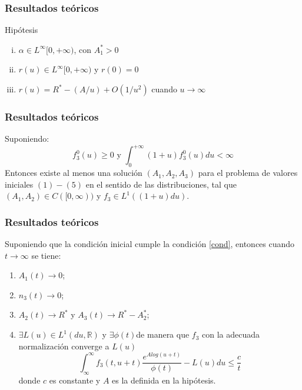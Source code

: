 \documentclass{beamer}
\begin{document}
\begin{frame}
	\frametitle{Resultados teóricos}
	\begin{block}{Hipótesis}
		
		\begin{enumerate}[(i)]
			\item $\alpha \in L^\infty[0,+\infty)$, con $A_1^*>0$
			\item $r(u)\in L^\infty[0,+\infty)$ y $r(0)=0$
			\item $r(u)=R^*-(A/u)+O(1/u^2)$ cuando $u\rightarrow\infty$
		\end{enumerate}
		
	\end{block}
	
\end{frame}


\begin{frame}
  \frametitle{Resultados teóricos}
\begin{theorem}
		Suponiendo: $$f_3^0(u)\geq0 \text{ y } \int_{0}^{+\infty}(1+u)f_3^0(u)du<\infty$$
		Entonces existe al menos una solución $(A_1,A_2,A_3)$ para el problema de valores iniciales $(1)-(5)$ en el sentido de las distribuciones, tal que $(A_1,A_2)\in C([0,\infty))$ y $f_3\in L^1((1+u)du)$.
\end{theorem}


\end{frame}



\begin{frame}
	\frametitle{Resultados teóricos}
	\begin{theorem}
	Suponiendo que la condición inicial cumple la condición \ref{cond}, entonces cuando $t\rightarrow\infty$ se tiene:
	\begin{enumerate}
		\item $A_1(t)\rightarrow0$;
		\item $n_3(t)\rightarrow0$;
		\item $A_2(t)\rightarrow R^*$ y $A_3(t)\rightarrow R^*-A_2^*$;
		\item $\exists L(u)\in L^1(du,\mathbb{R})$ y $\exists\phi(t)$de manera que $f_3$ con la adecuada normalización converge a $L(u)$
		$$\int_{\infty}^{\infty}f_3(t,u+t)\frac{e^{Alog(u+t)}}{\phi(t)}-L(u)du\leq\frac{c}{t}$$
		donde $c$ es constante y $A$ es la definida en la hipótesis.
	\end{enumerate}\label{teorema3}
	\end{theorem}
	
	
\end{frame}
\end{document}
